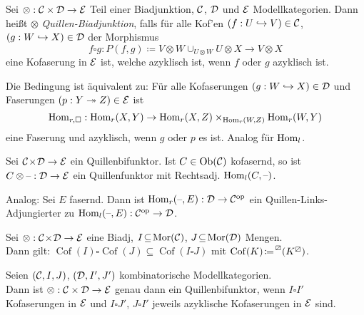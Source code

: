 \documentclass{cheat-sheet}
\newcommand{\lhhe}{\boxslash} %
\DeclareMathOperator{\Coff}{Cof} %
\begin{document}
\begin{defn}
  Sei $\otimes : \mathcal{C} \times \mathcal{D} \to \mathcal{E}$ Teil einer Biadjunktion, $\mathcal{C}$, $\mathcal{D}$ und $\mathcal{E}$ Modellkategorien.
  Dann heißt $\otimes$ \emph{Quillen-Biadjunktion}, falls für alle Kof'en $(f : U \hookrightarrow V) \in \mathcal{C}$, $(g : W \hookrightarrow X) \in \mathcal{D}$ der Morphismus
  \[ f \square g : P(f, g) \coloneqq V \otimes W \cup_{U \otimes W} U \otimes X \to V \otimes X \]
  eine Kofaserung in $\mathcal{E}$ ist, welche azyklisch ist, wenn $f$ oder $g$ azyklisch ist.
\end{defn}

\begin{lem}
  Die Bedingung ist äquivalent zu:
  Für alle Kofaserungen $(g : W \hookrightarrow X) \in \mathcal{D}$ und Faserungen $(p : Y \twoheadrightarrow Z) \in \mathcal{E}$ ist
  \[ \operatorname{Hom}_{r,\square} : \operatorname{Hom}_r(X, Y) \to \operatorname{Hom}_r(X, Z) \times_{\operatorname{Hom}_r(W, Z)} \operatorname{Hom}_r(W, Y) \]
  eine Faserung und azyklisch, wenn $g$ oder $p$ es ist.
  Analog für $\operatorname{Hom}_l$.
\end{lem}

\begin{prop}
  Sei $\mathcal{C} \!\times\! \mathcal{D} \to \mathcal{E}$ ein Quillenbifunktor.
  Ist $C \in \operatorname{Ob}(\mathcal{C})$ kofasernd, so ist $C \otimes \text{--} : \mathcal{D} \to \mathcal{E}$ ein Quillenfunktor mit Rechtsadj. $\operatorname{Hom}_l(C, \text{--})$.
\end{prop}

\begin{bem}
  Analog: Sei $E$ fasernd.
  Dann ist $\operatorname{Hom}_r(\text{--}, E) : \mathcal{D} \to \mathcal{C}^{\mathrm{op}}$ ein Quillen-Links-Adjungierter zu $\operatorname{Hom}_l(\text{--}, E) : \mathcal{C}^{\mathrm{op}} \to \mathcal{D}$.
\end{bem}

\begin{lem}
  Sei $\otimes : \mathcal{C} \!\times\! \mathcal{D} \to \mathcal{E}$ eine Biadj, $I \!\subseteq\! \operatorname{Mor}(\mathcal{C})$, $J \!\subseteq\! \operatorname{Mor}(\mathcal{D})$ Mengen. \\
  Dann gilt:
  $\Coff(I) \square \Coff(J) \subseteq \Coff(I \square J)$
  mit $\Coff(K) \!\coloneqq\! \prescript{\lhhe}{} (K^\lhhe)$.
\end{lem}

\begin{satz}
  Seien $(\mathcal{C}, I, J)$, $(\mathcal{D}, I', J')$ kombinatorische Modellkategorien. \\
  Dann ist $\otimes : \mathcal{C} \times \mathcal{D} \to \mathcal{E}$ genau dann ein Quillenbifunktor, wenn $I \square I'$ Kofaserungen in $\mathcal{E}$ und $I \square J'$, $J \square I'$ jeweils azyklische Kofaserungen in $\mathcal{E}$ sind.
\end{satz}
\end{document}
